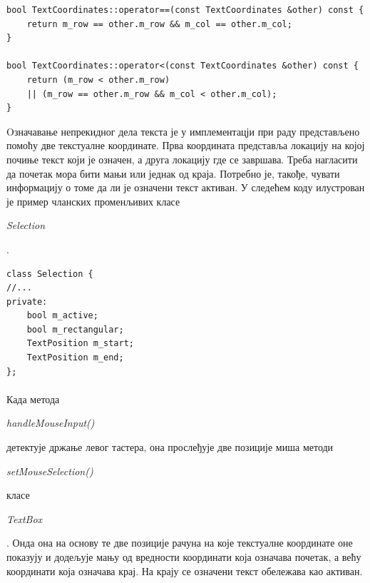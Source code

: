 \documentclass[12pt,oneside]{memoir}
\begin{document}
\begin{verbatim}
bool TextCoordinates::operator==(const TextCoordinates &other) const {
	return m_row == other.m_row && m_col == other.m_col;
}

bool TextCoordinates::operator<(const TextCoordinates &other) const {
	return (m_row < other.m_row) 
	|| (m_row == other.m_row && m_col < other.m_col);
}
\end{verbatim}

Oзначавање непрекидног дела текста је у имплементацји при раду представљено помоћу две текстуалне координате. Прва координата представља
локацију на којој почиње текст који је означен, а друга локацију где се завршава. Треба
нагласити да почетак мора бити мањи или једнак од краја. Потребно је, такође, чувати
информацију о томе да ли је означени текст активан. У следећем коду 
илустрован је пример чланских променљивих класе 
\begin{latinica}\textit{Selection}\end{latinica}.

\begin{verbatim}
class Selection {
//...
private:
	bool m_active;
	bool m_rectangular;
	TextPosition m_start;
	TextPosition m_end;
};
\end{verbatim}


\paragraph{}
Када метода \begin{latinica}\textit{handleMouseInput()}\end{latinica} детектује држање
левог тастера, она прослеђује две позиције миша методи \begin{latinica}\textit{setMouseSelection()}\end{latinica} класе
\begin{latinica}\textit{TextBox}\end{latinica}. Онда она на основу те две позиције
рачуна на које текстуалне координате оне показују и додељује мању од вредности координати
која означава почетак, а већу координати која означава крај. 
На крају се означени текст обележава као активан.
\end{document}
